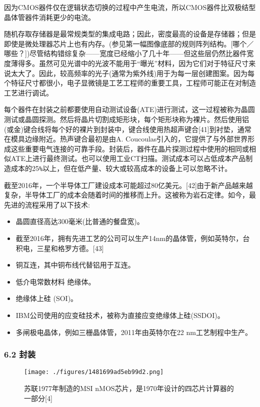 因为CMOS器件仅在逻辑状态切换的过程中产生电流，所以CMOS器件比双极结型晶体管器件消耗更少的电流。

随机存取存储器是最常规类型的集成电路；因此，密度最高的设备是存储器；但是即使是微处理器芯片上也有内存。(参见第一幅图像底部的规则阵列结构。[哪个／哪些？])尽管结构错综复杂——宽度已经缩小了几十年——但这些层仍然比器件宽度薄得多。虽然可见光谱中的光波不能用于“曝光”材料，因为它们对于特征尺寸来说太大了。因此，较高频率的光子(通常为紫外线)用于为每一层创建图案。因为每个特征尺寸都很小，电子显微镜是工艺工程师的重要工具，工程师可能正在对制造工艺进行调试。

每个器件在封装之前都要使用自动测试设备(ATE)进行测试，这一过程被称为晶圆测试或晶圆探测。然后将晶片切割成矩形块，每个矩形块称为裸片。然后使用铝(或金)键合线将每个好的裸片到封装中，键合线使用热超声键合[41]到衬垫，通常在模具边缘附近。热声键合最初是由A. Coucoulas引入的，它提供了与外部世界形成这些重要电气连接的可靠手段。封装后，器件在晶片探测过程中使用的相同或相似ATE上进行最终测试。也可以使用工业CT扫描。测试成本可以占低成本产品制造成本的25\verb`%`以上，但在低产量、较大或较高成本的设备上可以忽略不计。

截至2016年，一个半导体工厂建设成本可能超过80亿美元。[42]由于新产品越来越复杂，半导体工厂的成本会随着时间的推移而上升。这被称为岩石定律。如今，最先进的流程采用了以下技术:

\begin{itemize}
\item 晶圆直径高达300毫米(比普通的餐盘宽)。
\item 截至2016年，拥有先进工艺的公司可以生产14nm的晶体管，例如英特尔，台积电，三星和格罗方德。[43]
\item 铜互连，其中铜布线代替铝用于互连。
\item 低介电常数材料 绝缘体。
\item 绝缘体上硅 (SOI)。
\item IBM公司使用的应变硅技术，被称为直接应变绝缘体上硅(SSDOI)。
\item 多闸极电晶体，例如三栅晶体管，2011年由英特尔在22 nm工艺制程中生产。
\end{itemize}

\subsubsection{6.2 封装}

\begin{figure}[ht]
\centering
\texttt{[image: ./figures/1481699ad5eb99d2.png]}
\caption{苏联1977年制造的MSI nMOS芯片，是1970年设计的四芯片计算器的一部分[4]} \label{fig_icJCDL_7}
\end{figure}

